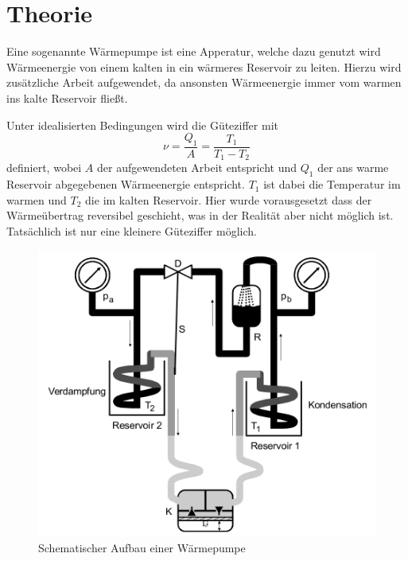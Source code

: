 \section{Theorie}
\label{sec:Theorie}




Eine sogenannte Wärmepumpe ist eine Apperatur, welche dazu genutzt wird Wärmeenergie von einem kalten in ein wärmeres Reservoir zu leiten. 
Hierzu wird zusätzliche Arbeit aufgewendet, da ansonsten Wärmeenergie immer vom warmen ins kalte Reservoir fließt.

Unter idealisierten Bedingungen wird die Güteziffer mit
\begin{equation}
    \nu = \frac{Q_1}{A} = \frac{T_1}{T_1-T_2}
    \label{eq:gueteziffer}
\end{equation}
definiert, wobei $A$ der aufgewendeten Arbeit entspricht und $Q_1$ der ans warme Reservoir abgegebenen Wärmeenergie entspricht. $T_1$ ist dabei die Temperatur im warmen und $T_2$ die im kalten Reservoir. \cite{V206}
Hier wurde vorausgesetzt dass der Wärmeübertrag reversibel geschieht, was in der Realität aber nicht möglich ist. Tatsächlich ist nur eine kleinere Güteziffer möglich.

\begin{figure}
    \centering
    \includegraphics[width=\textwidth/2]{images/skizze_1.png}
    \caption{Schematischer Aufbau einer Wärmepumpe\cite{V206}}
    \label{fig:skizze_1}
\end{figure}

